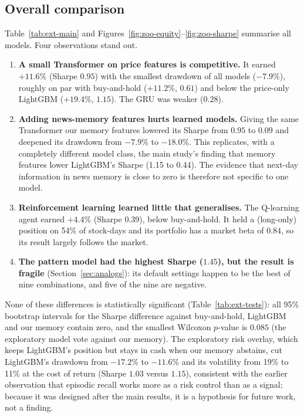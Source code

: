\subsection{Overall comparison}
Table~\ref{tab:ext-main} and Figures~\ref{fig:zoo-equity}--\ref{fig:zoo-sharpe} summarise all models. Four observations stand out.
\begin{enumerate}
  \item \textbf{A small Transformer on price features is competitive.} It earned $+11.6\%$ (Sharpe $0.95$) with the smallest drawdown of all models ($-7.9\%$), roughly on par with buy-and-hold ($+11.2\%$, $0.61$) and below the price-only LightGBM ($+19.4\%$, $1.15$). The GRU was weaker ($0.28$).
  \item \textbf{Adding news-memory features hurts learned models.} Giving the same Transformer our memory features lowered its Sharpe from $0.95$ to $0.09$ and deepened its drawdown from $-7.9\%$ to $-18.0\%$. This replicates, with a completely different model class, the main study's finding that memory features lower LightGBM's Sharpe (1.15 to 0.44). The evidence that next-day information in news memory is close to zero is therefore not specific to one model.
  \item \textbf{Reinforcement learning learned little that generalises.} The Q-learning agent earned $+4.4\%$ (Sharpe $0.39$), below buy-and-hold. It held a (long-only) position on 54\% of stock-days and its portfolio has a market beta of $0.84$, so its result largely follows the market.
  \item \textbf{The pattern model had the highest Sharpe ($1.45$), but the result is fragile} (Section~\ref{sec:analogs}): its default settings happen to be the best of nine combinations, and five of the nine are negative.
\end{enumerate}
None of these differences is statistically significant (Table~\ref{tab:ext-tests}): all 95\% bootstrap intervals for the Sharpe difference against buy-and-hold, LightGBM and our memory contain zero, and the smallest Wilcoxon $p$-value is $0.085$ (the exploratory model vote against our memory). The exploratory risk overlay, which keeps LightGBM's position but stays in cash when our memory abstains, cut LightGBM's drawdown from $-17.2\%$ to $-11.6\%$ and its volatility from 19\% to 11\% at the cost of return (Sharpe $1.03$ versus $1.15$), consistent with the earlier observation that episodic recall works more as a risk control than as a signal; because it was designed after the main results, it is a hypothesis for future work, not a finding.

